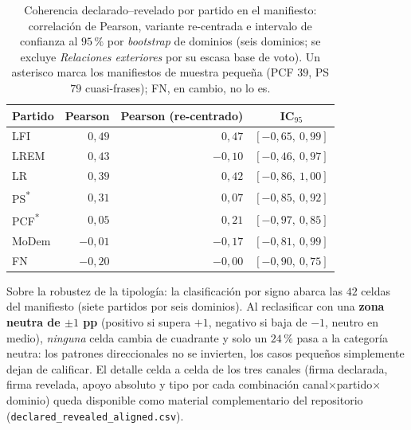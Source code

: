 \begin{table}[H]
\centering
\caption{Coherencia declarado--revelado por partido en el manifiesto: correlación
de Pearson, variante re-centrada e intervalo de confianza al $95\,\%$ por
\emph{bootstrap} de dominios (seis dominios; se excluye \emph{Relaciones exteriores}
por su escasa base de voto). Un asterisco marca los manifiestos de muestra pequeña
(PCF $39$, PS $79$ cuasi-frases); FN, en cambio, no lo es.}
\label{tab:cruce-coherencia-anexo}
\begin{tabular}{@{}l r r c@{}}
\toprule
\textbf{Partido} & \textbf{Pearson} & \textbf{Pearson (re-centrado)} & \textbf{IC$_{95}$} \\
\midrule
LFI & $0{,}49$ & $0{,}47$ & $[-0{,}65,\ 0{,}99]$ \\
LREM & $0{,}43$ & $-0{,}10$ & $[-0{,}46,\ 0{,}97]$ \\
LR & $0{,}39$ & $0{,}42$ & $[-0{,}86,\ 1{,}00]$ \\
PS\textsuperscript{*} & $0{,}31$ & $0{,}07$ & $[-0{,}85,\ 0{,}92]$ \\
PCF\textsuperscript{*} & $0{,}05$ & $0{,}21$ & $[-0{,}97,\ 0{,}85]$ \\
MoDem & $-0{,}01$ & $-0{,}17$ & $[-0{,}81,\ 0{,}99]$ \\
FN & $-0{,}20$ & $-0{,}00$ & $[-0{,}90,\ 0{,}75]$ \\
\bottomrule
\end{tabular}
\end{table}

Sobre la robustez de la tipología: la clasificación por signo abarca las
$42$ celdas del manifiesto (siete partidos por seis dominios). Al reclasificar con
una \textbf{zona neutra de $\pm 1$ pp} (positivo si supera $+1$, negativo si baja
de $-1$, neutro en medio), \emph{ninguna} celda cambia de cuadrante y solo un
$24\,\%$ pasa a la categoría neutra: los patrones direccionales no se invierten,
los casos pequeños simplemente dejan de calificar. El detalle celda a celda de los
tres canales (firma declarada, firma revelada, apoyo absoluto y tipo por cada
combinación canal$\times$partido$\times$dominio) queda disponible como material
complementario del repositorio (\texttt{declared\_revealed\_aligned.csv}).
